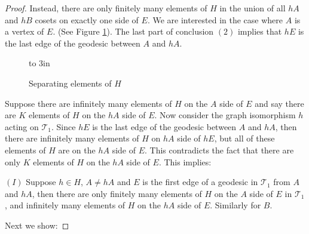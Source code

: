 \documentclass[10pt,a4paper]{amsart}
\begin{document}
\begin{proof}
Instead, there are only finitely many elements of $H$ in the union of all $hA$ and $hB$ cosets on exactly one side of $E$. We are interested in the case where $A$ is a vertex of $E$. (See Figure \ref{FigEndPair1}). The last part of conclusion $(2)$ implies that $hE$ is the last edge of the geodesic between $A$ and $hA$. 

\begin{figure}
\vbox to 3in{\vspace {-2in} \hspace {-.1in}
\hspace{-1 in}

\vss }
\vspace{-3in}
\caption{Separating elements of $H$} 
\label{FigEndPair1}
\end{figure}

Suppose there are infinitely many elements of $H$ on the $A$ side of $E$ and say there are $K$ elements of $H$ on the $hA$ side of $E$.  Now consider the graph isomorphism $h$ acting on $\mathcal T_1$. %
Since $hE$ is the last edge of the geodesic between $A$ and $hA$, then there are infinitely many elements of $H$ on $hA$ side of $hE$, but all of these elements of $H$ are on the $hA$ side of $E$. This contradicts the fact that there are only $K$ elements of $H$ on the $hA$ side of $E$. 
This implies: 

\medskip

$(I)$ Suppose $h\in H$, $A\ne hA$ and $E$ is the first edge of a geodesic in $\mathcal T_1$ from $A$ and $hA$, then there are only finitely many elements of $H$ on the $A$ side of $E$ in $\mathcal T_1$, and infinitely many elements of $H$ on the $hA$ side of $E$.  
Similarly for $B$. 
 

\medskip

Next we show:

\medskip


\end{proof}
\end{document}
